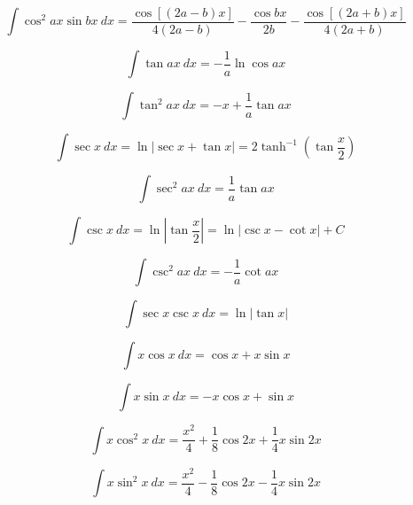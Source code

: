 \begin{equation*}
\int \cos^2 ax \sin bx\ dx = \frac{\cos[(2a-b)x]}{4(2a-b)} 
- \frac{\cos bx}{2b}
- \frac{\cos[(2a+b)x]}{4(2a+b)}
\end{equation*}

\begin{equation*}
\int \tan ax\ dx = -\frac{1}{a} \ln \cos ax 
\end{equation*}

\begin{equation*}
\int \tan^2 ax\ dx = -x + \frac{1}{a} \tan ax 
\end{equation*}

\begin{equation*}
\int \sec x \ dx = \ln | \sec x + \tan x | = 2 \tanh^{-1} \left (\tan \frac{x}{2} \right) 
\end{equation*}

\begin{equation*}
\int \sec^2 ax\ dx = \frac{1}{a} \tan ax 
\end{equation*}

\begin{equation*}
\int \csc x\ dx = \ln \left | \tan \frac{x}{2} \right|  = \ln | \csc x - \cot x| + C
\end{equation*}

\begin{equation*}
\int \csc^2 ax\ dx = -\frac{1}{a} \cot ax 
\end{equation*}

\begin{equation*}
\int \sec x \csc x \ dx = \ln | \tan x | 
\end{equation*}

\begin{equation*}
\int x \cos x \ dx = \cos x + x \sin x 
\end{equation*}

\begin{equation*}
\int x \sin x\ dx = -x \cos x + \sin x 
\end{equation*}

\begin{equation*}
\int x \cos^2 x \ dx = \frac{x^2}{4}+\frac{1}{8}\cos 2x + \frac{1}{4} x \sin 2x
\end{equation*}

\begin{equation*}
\int x \sin^2 x \ dx = \frac{x^2}{4}-\frac{1}{8}\cos 2x - \frac{1}{4} x \sin 2x
\end{equation*}
\small

